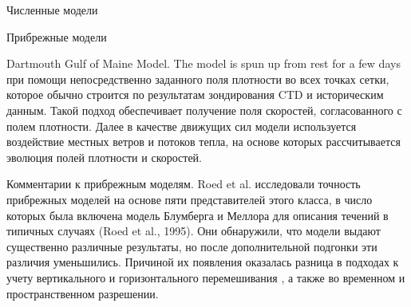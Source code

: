 \begin{chapter}{Численные модели}
\begin{section}{Прибрежные модели}
\begin{paragraph}{Dartmouth Gulf of Maine Model.}
The model is spun up from rest for a few days при помощи непосредственно 
заданного поля плотности во всех точках сетки, которое обычно строится по
результатам зондирования CTD и историческим данным. Такой подход
обеспечивает получение поля скоростей, согласованного с полем плотности. 
Далее в качестве движущих сил модели используется воздействие местных ветров 
и потоков тепла, на основе которых рассчитывается эволюция полей плотности
и скоростей.
%
\end{paragraph}

\begin{paragraph}{Комментарии к прибрежным моделям.}
Roed et al. исследовали точность
прибрежных моделей на основе пяти представителей этого класса, в число которых
была включена модель Блумберга и Меллора для описания течений в типичных 
случаях (Roed et al., 1995). Они обнаружили, что модели выдают существенно
различные результаты, но после дополнительной подгонки эти
различия уменьшились. Причиной их появления оказалась разница в подходах
к учету вертикального и горизонтального перемешивания%
, а также во временном и
пространственном разрешении.
% 


\end{paragraph}
\end{section}
\end{chapter}
